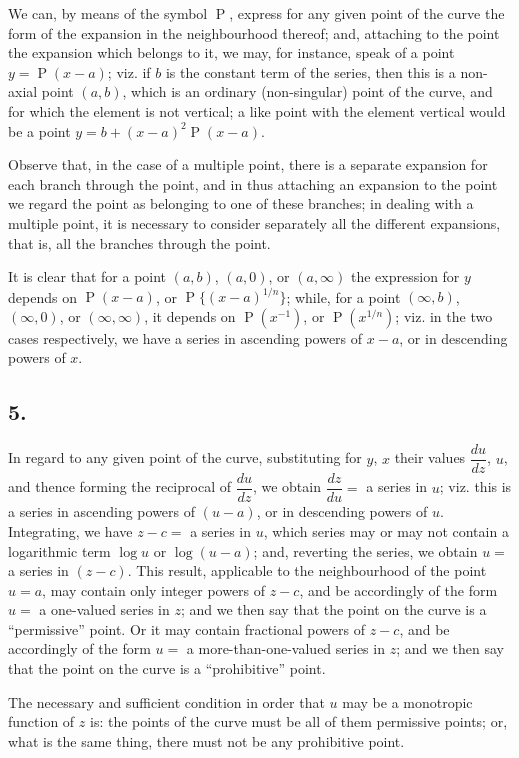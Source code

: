 \documentclass[11pt,a4paper]{article}
\theoremstyle{definition}
\DeclareMathOperator{\Pf}{P}
\begin{document}
We can, by means of the symbol $\Pf$, express for any given point of the curve the form of the expansion in the neighbourhood thereof; and, attaching to the point the expansion which belongs to it, we may, for instance, speak of a point $y = \Pf(x - a)$; viz. if $b$ is the constant term of the series, then this is a non-axial point $(a, b)$, which is an ordinary (non-singular) point of the curve, and for which the element is not vertical; a like point with the element vertical would be a point $y = b + (x - a)^2 \Pf(x - a)$.

Observe that, in the case of a multiple point, there is a separate expansion for each branch through the point, and in thus attaching an expansion to the point we regard the point as belonging to one of these branches; in dealing with a multiple point, it is necessary to consider separately all the different expansions, that is, all the branches through the point.

It is clear that for a point $(a, b)$, $(a, 0)$, or $(a, \infty)$ the expression for $y$ depends on $\Pf(x - a)$, or $\Pf\{(x - a)^{1/n}\}$; while, for a point $(\infty, b)$, $(\infty, 0)$, or $(\infty, \infty)$, it depends on $\Pf(x^{-1})$, or $\Pf(x^{1/n})$; viz. in the two cases respectively, we have a series in ascending powers of $x - a$, or in descending powers of $x$.

\subsection*{5.}

In regard to any given point of the curve, substituting for $y$, $x$ their values $\dfrac{du}{dz}$, $u$, and thence forming the reciprocal of $\dfrac{du}{dz}$, we obtain $\dfrac{dz}{du} =$ a series in $u$; viz. this is a series in ascending powers of $(u - a)$, or in descending powers of $u$. Integrating, we have $z - c =$ a series in $u$, which series may or may not contain a logarithmic term $\log u$ or $\log(u - a)$; and, reverting the series, we obtain $u =$ a series in $(z - c)$. This result, applicable to the neighbourhood of the point $u = a$, may contain only integer powers of $z-c$, and be accordingly of the form $u =$ a one-valued series in $z$; and we then say that the point on the curve is a ``permissive'' point. Or it may contain fractional powers of $z-c$, and be accordingly of the form $u =$ a more-than-one-valued series in $z$; and we then say that the point on the curve is a ``prohibitive'' point.

The necessary and sufficient condition in order that $u$ may be a monotropic function of $z$ is: the points of the curve must be all of them permissive points; or, what is the same thing, there must not be any prohibitive point.
\end{document}
